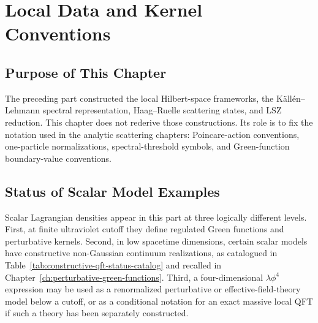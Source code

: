 \chapter{Local Data and Kernel Conventions}
\label{ch:volume-ii-local-data}
\ConventionsMixed


\section{Purpose of This Chapter}

The preceding part constructed the local Hilbert-space frameworks, the
K\"all\'en--Lehmann spectral representation, Haag--Ruelle scattering states,
and LSZ reduction.  This chapter does not rederive those constructions.  Its
role is to fix the notation used in the analytic scattering chapters:
Poincare-action conventions, one-particle normalizations, spectral-threshold
symbols, and Green-function boundary-value conventions.

\section{Status of Scalar Model Examples}
\label{sec:volume-ii-scalar-model-status}

\begin{definition}
\label{def:volume-ii-scalar-model-use-levels}
Scalar Lagrangian densities appear in this part at three logically different
levels.  First, at finite ultraviolet cutoff they define regulated Green
functions and perturbative kernels.  Second, in low spacetime dimensions,
certain scalar models have constructive non-Gaussian continuum realizations, as
catalogued in Table~\ref{tab:constructive-qft-status-catalog} and recalled in
Chapter~\ref{ch:perturbative-green-functions}.  Third, a
four-dimensional \(\lambda\phi^4\) expression may be used as a renormalized
perturbative or effective-field-theory model below a cutoff, or as a
conditional notation for an exact massive local QFT if such a theory has been
separately constructed.
\end{definition}

